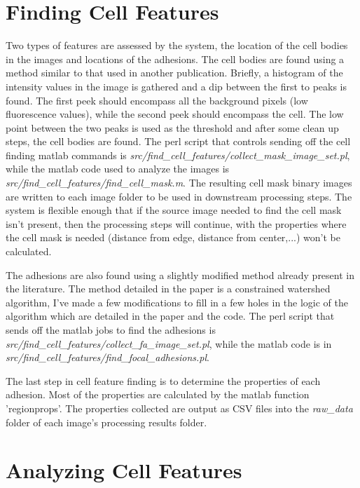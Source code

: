 \documentclass[letterpaper]{article}
\begin{document}
\section{Finding Cell Features}

	Two types of features are assessed by the system, the location of the cell
	bodies in the images and locations of the adhesions. The cell bodies are
	found using a method similar to that used in another
	publication\cite{Machacek06}.  Briefly, a histogram of the intensity values
	in the image is gathered and a dip between the first to peaks is found. The
	first peek should encompass all the background pixels (low fluorescence
	values), while the second peek should encompass the cell. The low point
	between the two peaks is used as the threshold and after some clean up
	steps, the cell bodies are found. The perl script that controls sending off
	the cell finding matlab commands is
	\emph{src/find\_cell\_features/collect\_mask\_image\_set.pl}, while the
	matlab code used to analyze the images is
	\emph{src/find\_cell\_features/find\_cell\_mask.m}. The resulting cell mask
	binary images are written to each image folder to be used in downstream
	processing steps. The system is flexible enough that if the source image
	needed to find the cell mask isn't present, then the processing steps will
	continue, with the properties where the cell mask is needed (distance from
	edge, distance from center,...) won't be calculated.

	The adhesions are also found using a slightly modified method already
	present in the literature\cite{Zamir1999}. The method detailed in the paper
	is a constrained watershed algorithm, I've made a few modifications to fill
	in a few holes in the logic of the algorithm which are detailed in the paper
	and the code. The perl script that sends off the matlab jobs to find the
	adhesions is \emph{src/find\_cell\_features/collect\_fa\_image\_set.pl},
	while the matlab code is in
		\emph{src/find\_cell\_features/find\_focal\_adhesions.pl}.

	The last step in cell feature finding is to determine the properties of each
	adhesion. Most of the properties are calculated by the matlab function
	'regionprops'. The properties collected are output as CSV files into the
	\emph{raw\_data} folder of each image's processing results folder.

\section{Analyzing Cell Features}
\end{document}
